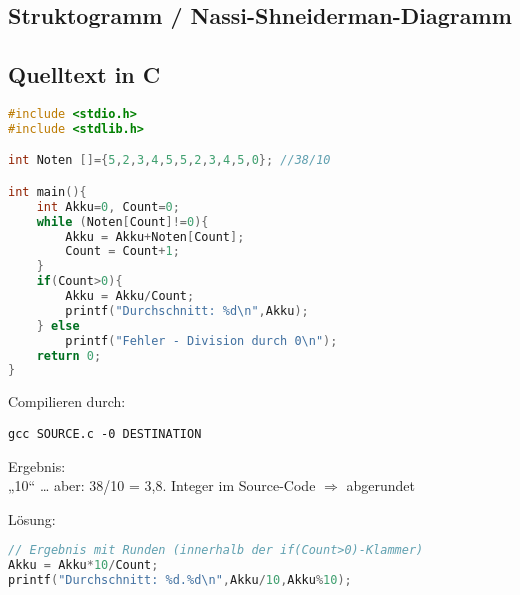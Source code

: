 \subsection[Struktogramm]{Struktogramm / Nassi-Shneiderman-Diagramm}


\subsection{Quelltext in C}

\begin{lstlisting}[language=C]
#include <stdio.h>
#include <stdlib.h>

int Noten []={5,2,3,4,5,5,2,3,4,5,0}; //38/10

int main(){
	int Akku=0, Count=0;
	while (Noten[Count]!=0){
		Akku = Akku+Noten[Count];
		Count = Count+1;
	}
	if(Count>0){
		Akku = Akku/Count;
		printf("Durchschnitt: %d\n",Akku);
	} else
		printf("Fehler - Division durch 0\n");
	return 0;
}
\end{lstlisting}

Compilieren durch: 
\begin{lstlisting}
gcc SOURCE.c -0 DESTINATION
\end{lstlisting}

Ergebnis:\\
„10“ … aber: 38/10 = 3,8. Integer im Source-Code $\Rightarrow$ abgerundet

Lösung:
\begin{lstlisting}[language=C]
// Ergebnis mit Runden (innerhalb der if(Count>0)-Klammer)
Akku = Akku*10/Count;
printf("Durchschnitt: %d.%d\n",Akku/10,Akku%10);
\end{lstlisting}

